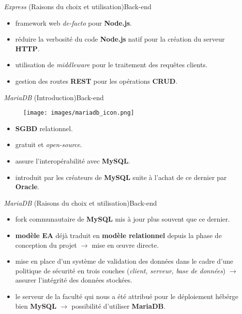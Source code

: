 \documentclass[usenames,dvipsnames]{beamer}
\begin{document}
\begin{frame}{\textit{Express} (Raisons du choix et utilisation)}{Back-end}
  \begin{itemize}
    \item framework web \textit{de-facto} pour \textbf{Node.js}.
    \item réduire la verbosité du code \textbf{Node.js} natif pour la création du serveur \textbf{HTTP}.
    \item utilisation de \textit{middleware} pour le traitement des requêtes clients.
    \item gestion des routes \textbf{REST} pour les opérations \textbf{CRUD}.
  \end{itemize}
\end{frame}
\begin{frame}{\textit{MariaDB} (Introduction)}{Back-end}
  \begin{figure}[!ht]
    \centering
    \texttt{[image: images/mariadb\_icon.png]}
  \end{figure}

  \begin{itemize}
    \item \textbf{SGBD} relationnel.
    \item gratuit et \textit{open-source}.
    \item assure l'interopérabilité avec \textbf{MySQL}.
    \item introduit par les créateurs de \textbf{MySQL} suite à l'achat de ce dernier par \textbf{Oracle}.
  \end{itemize}
\end{frame}

\begin{frame}{\textit{MariaDB} (Raisons du choix et utilisation)}{Back-end}
  \begin{itemize}
    \item fork communautaire de \textbf{MySQL} mis à jour plus souvent que ce dernier.
    \item \textbf{modèle EA} déjà traduit en \textbf{modèle relationnel} depuis la phase de conception du projet $\rightarrow$ mise en \oe{}uvre directe.
    \item mise en place d'un système de validation des données dans le cadre d'une politique de sécurité en trois couches (\textit{client, serveur, base de données}) $\rightarrow$ assurer l'intégrité des données stockées.
    \item le serveur de la faculté qui nous a été attribué pour le déploiement hébérge bien \textbf{MySQL} $\rightarrow$ possibilité d'utiliser \textbf{MariaDB}.
  \end{itemize}
\end{frame}
\end{document}
